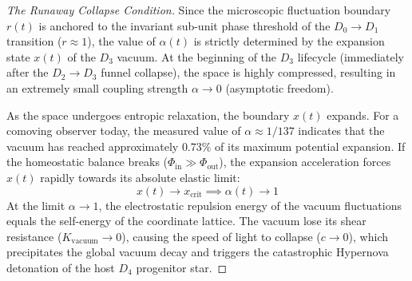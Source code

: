 \documentclass[11pt,a4paper]{article}
\theoremstyle{plain}
\theoremstyle{definition}
\theoremstyle{remark}
\begin{document}
\begin{proof}[The Runaway Collapse Condition]
Since the microscopic fluctuation boundary $r(t)$ is anchored to the invariant sub-unit phase threshold of the $D_0 \to D_1$ transition ($r \approx 1$), the value of $\alpha(t)$ is strictly determined by the expansion state $x(t)$ of the $D_3$ vacuum. 
At the beginning of the $D_3$ lifecycle (immediately after the $D_2 \to D_3$ funnel collapse), the space is highly compressed, resulting in an extremely small coupling strength $\alpha \to 0$ (asymptotic freedom). 

As the space undergoes entropic relaxation, the boundary $x(t)$ expands. For a comoving observer today, the measured value of $\alpha \approx 1/137$ indicates that the vacuum has reached approximately $0.73\%$ of its maximum potential expansion. 
If the homeostatic balance breaks ($\Phi_{\text{in}} \gg \Phi_{\text{out}}$), the expansion acceleration forces $x(t)$ rapidly towards its absolute elastic limit:
\begin{equation}
x(t) \to x_{\text{crit}} \implies \alpha(t) \to 1
\end{equation}
At the limit $\alpha \to 1$, the electrostatic repulsion energy of the vacuum fluctuations equals the self-energy of the coordinate lattice. The vacuum lose its shear resistance ($K_{\text{vacuum}} \to 0$), causing the speed of light to collapse ($c \to 0$), which precipitates the global vacuum decay and triggers the catastrophic Hypernova detonation of the host $D_4$ progenitor star.
\end{proof}
\end{document}
